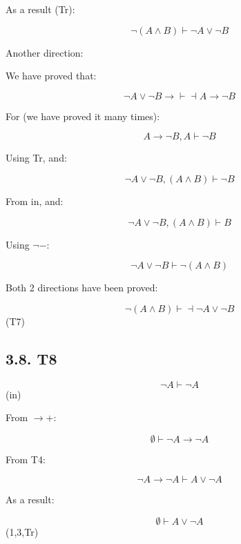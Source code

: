 \documentclass{article} %
\begin{document}
As a result (Tr):

\[\neg (A \wedge B) \vdash \neg A \vee \neg B\]

Another direction:

We have proved that:

\[ \neg A \vee \neg B \rightarrow \vdash \dashv A \rightarrow \neg B\]

For (we have proved it many times):

\[ A \rightarrow \neg B, A \vdash \neg B\]

Using Tr, and:

\[ \neg A \vee \neg B , (A \wedge B)\vdash \neg B \]

From in, and:

\[ \neg A \vee \neg B , (A \wedge B)\vdash B \]

Using \(\neg-\):

\[ \neg A \vee \neg B \vdash \neg (A \wedge B) \]

Both 2 directions have been proved:

\[\neg (A \wedge B) \vdash \dashv \neg A \vee \neg B\] (T7)

\hypertarget{t8}{%
\subsection{3.8. T8}\label{t8}}

\[\neg A \vdash \neg A\] (in)

From \(\rightarrow+\):

\[\emptyset \vdash \neg A \rightarrow \neg A\]

From T4:

\[\neg A \rightarrow \neg A \vdash A \vee \neg A\]

As a result:

\[\emptyset \vdash A \vee \neg A\] (1,3,Tr)
\end{document}
